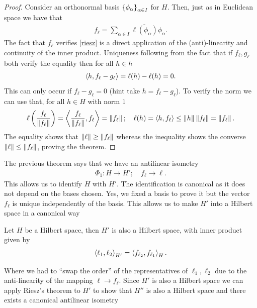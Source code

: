 \documentclass[
    a4paper,
    DIV=14,
    abstract=true,
    numbers=noenddot
]{scrartcl}
\begin{document}
	\begin{proof}
		Consider an orthonormal basis $\left\{\phi_\alpha\right\}_{\alpha \in  I}$ for $H$. Then, just as in  Euclidean space we have that
		\begin{align*}
			f_\ell =\sum_{\alpha \in I}\overline{\ell (\phi_\alpha)}\phi_\alpha  .
		\end{align*}
		The fact that $f_\ell $ verifies \eqref{riesz} is a direct application of the (anti)-linearity and continuity of the inner product. Uniqueness following from the fact that if $f_\ell , g_\ell $ both verify the equality then for all $h \in h$
		\begin{align*}
			\left\langle h, f_\ell -g_\ell \right\rangle= \ell (h)-\ell (h)=0.
		\end{align*}
		This can only occur if $f_\ell -g_\ell =0$ (hint take $h= f_\ell -g_\ell $). To verify the norm we can use that, for all $h \in  H$ with norm $1$
		\begin{align*}
			\ell   \left(\frac{f_\ell }{\left\lVert f_\ell  \right\rVert} \right)= \left\langle\frac{f_\ell }{\left\lVert f_\ell  \right\rVert} ,f_\ell \right\rangle=\left\lVert f_\ell  \right\rVert; \quad \ell(h)= \left\langle h, f_\ell \right\rangle\leq \left\lVert h \right\rVert\left\lVert f_\ell  \right\rVert= \left\lVert f_\ell  \right\rVert.
		\end{align*}
		The equality shows that $\left\lVert \ell  \right\rVert\geq \left\lVert f_\ell  \right\rVert$ whereas the inequality shows the converse $\left\lVert \ell  \right\rVert\leq \left\lVert f_\ell  \right\rVert$, proving the theorem.
	\end{proof}
	The previous theorem says that we have an antilinear isometry
	\begin{align*}
		\Phi_1:    H\to H';\quad f_\ell  \to \ell .
	\end{align*}
	This allows us to identify $H$ with  $H'$. The identification is canonical as it does not depend on the bases chosen. Yes, we fixed a basis to prove it but the vector $f_\ell $ is unique independently of the basis. This allows us to make $H'$ into a Hilbert space in a canonical way
	\begin{proposition}
		Let $H$ be a Hilbert space, then  $H'$ is also a Hilbert space, with inner product given by
		\begin{align*}
			\left\langle\ell_1 , \ell_2 \right\rangle_{H'}=\left\langle f_{\ell _2},f_{\ell_1 }\right\rangle_H.
		\end{align*}
	\end{proposition}
	Where we had to ``swap the order'' of the representatives of $\ell_1, \ell_2$ due to the anti-linearity of the mapping $\ell \to f_\ell $. Since $H'$ is also a Hilbert space we can apply Riesz's theorem to $H'$ to show that $H''$ is also a Hilbert space and there exists a canonical antilinear isometry
\end{document}
